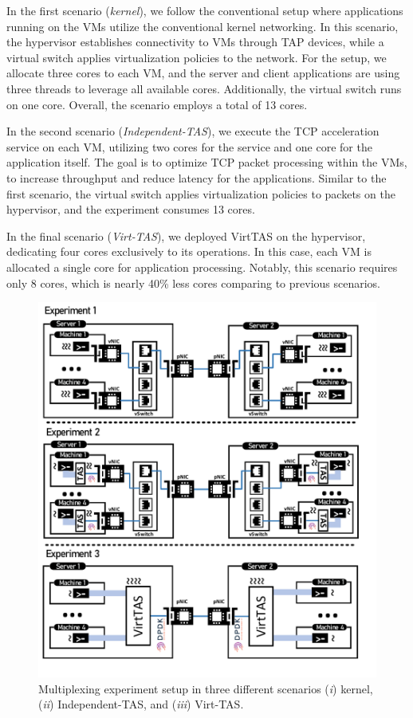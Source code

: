 In the first scenario (\emph{kernel}), we follow the conventional 
setup where applications running on the VMs utilize the conventional kernel 
networking. In this scenario, the hypervisor establishes connectivity to VMs through 
TAP devices, while a virtual switch applies virtualization policies to the network. 
For the setup, we allocate three cores to each VM, and the server and client applications 
are using three threads to leverage all available cores. 
Additionally, the virtual switch runs on one core. Overall, the scenario employs
a total of 13 cores. 

In the second scenario (\emph{Independent-TAS}), we execute the TCP acceleration service on each VM, 
utilizing two cores for the service and one core for the application itself. 
The goal is to optimize TCP packet processing within the VMs, 
to increase throughput and reduce latency for the applications. 
Similar to the first scenario, the virtual switch applies virtualization policies 
to packets on the hypervisor, and the experiment consumes 13 cores.


In the final scenario (\emph{Virt-TAS}), we deployed VirtTAS on the hypervisor, dedicating four 
cores exclusively to its operations. In this case, each VM is allocated a single 
core for application processing. Notably, this scenario requires only 8 cores,
which is nearly 40\% less cores comparing to previous scenarios.

\begin{figure}
    \centering
    \includegraphics[scale=0.75]{../Figures/multiplexing.experiment.pdf}
    \caption{Multiplexing experiment setup in three different scenarios (\emph{i}) kernel, 
    (\emph{ii}) Independent-TAS, and (\emph{iii}) Virt-TAS.}
    \label{fig:multiplexing.experiment}
\end{figure}

